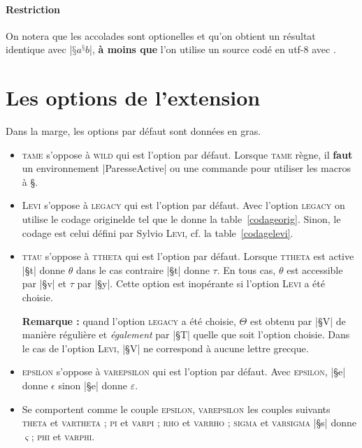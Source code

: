 \documentclass[full, french]{l3doc}
\newcommand\Option[1]{\textsc{#1}}
\begin{document}
\paragraph{Restriction}
On notera que les accolades sont optionelles et qu'on obtient un
résultat identique avec |\(§a^§b\)|, \textbf{à moins que} l'on utilise
un source codé en utf-8 avec .\label{restriction}


\section{Les options de l'extension}
\label{sec:clefs}

Dans la marge, les options par défaut sont données en gras.


\begin{itemize}
\item \Option{tame}  s'oppose à
  \Option{wild} qui est l'option par défaut. Lorsque \Option{tame}
  règne, il \textbf{faut} un environnement |ParesseActive| ou une
  commande  pour utiliser les macros à §.

\item \Option{Levi}  s'oppose à
  \Option{legacy} qui est l'option par défaut. Avec l'option
  \Option{legacy} on utilise le codage \og originel\fg de
   tel que le donne la
  table~\ref{codageorig}. Sinon, le codage est celui défini par Sylvio
  \textsc{Levi}, cf. la table~\ref{codagelevi}.

\item \Option{ttau}  s'oppose à
  \Option{ttheta} qui est l'option par défaut. Lorsque \Option{ttheta}
  est active |§t| donne \(\theta\) dans le cas contraire |§t| donne
  \(\tau\). En tous cas, \(\theta\) est accessible par |§v| et
  \(\tau\) par |§y|.  Cette option est inopérante si l'option
  \Option{Levi} a été choisie.

  \textbf{Remarque :}  quand l'option \Option{legacy} a été choisie,
  \(\Theta\) est obtenu par |§V| de manière \og régulière \fg et
  \emph{également} par |§T| quelle que soit l'option choisie. Dans
  le cas de l'option \Option{Levi}, |§V| ne correspond à aucune lettre
  grecque.

\item \Option{epsilon}  s'oppose à
  \Option{varepsilon} qui est l'option par défaut. Avec
  \Option{epsilon}, |§e| donne \(\epsilon\) sinon |§e| donne
  \(\varepsilon\).

\item Se comportent comme le couple \Option{epsilon},
  \Option{varepsilon} les couples suivants \Option{theta} et
  \Option{vartheta} ; \Option{pi} et \Option{varpi} ; \Option{rho} et
  \Option{varrho} ; \Option{sigma} et \Option{varsigma} \og |§s| donne
  \(\varsigma\)\fg; \Option{phi} et \Option{varphi}.
\end{itemize}
\end{document}
